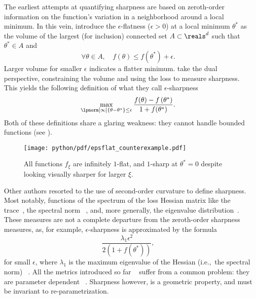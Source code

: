 The earliest attempts at quantifying sharpness are based on zeroth-order information
on the function's variation in a neighborhood around a local minimum.
In this vein, \citet{hochreiterFlatMinima1997} introduce
the \(\epsilon\)-flatness (\(\epsilon \gt 0\)) at a local minimum \(\theta^{\ast}\) as
the volume of the largest (for inclusion) connected set \(A \subset \reals^{d}\) such that
\(\theta^{\ast}\in A \) and
\begin{equation}\label{eq:sharpness:epsflatness}
	\forall \theta\in A, \quad f(\theta) \leq f(\theta^{\ast}) + \epsilon.
\end{equation}
Larger volume for smaller \(\epsilon\) indicates a flatter minimum.
\citet{keskarLargeBatchTrainingDeep2022} take the dual perspective,
constraining the volume and using the loss to measure sharpness.
This yields the following definition of what they call \(\epsilon\)-sharpness
\begin{equation}\label{eq:sharpness:epsharpness}
	\max_{\lpnorm[\infty]{\theta - \theta^{\ast}}\le\epsilon}%
	{\frac{f(\theta) - f\left( \theta^{\ast} \right)}{1+f(\theta^{\ast})}}.
\end{equation}
Both of these definitions share a glaring weakness: they cannot handle bounded functions
(see ).
\begin{figure}[hbt]
	\begin{center}
		\texttt{[image: python/pdf/epsflat\_counterexample.pdf]}
	\end{center}
	\caption{%
		All functions \(f_{\xi}\) are infinitely \(1\)-flat, and \(1\)-sharp at \(\theta^{\ast} = 0\)
		despite looking visually sharper for larger \(\xi\).
	}\label{fig:epsflat_counterexample}
\end{figure}

Other authors resorted to the use of second-order curvature to define sharpness.
Most notably, functions of the spectrum of the loss Hessian matrix
like the trace~\cite{%
	yangTaxonomizingLocalGlobal2021,%
	petzkaRelativeFlatnessGeneralization2021,%
	ibayashiMinimumSharpnessScaleinvariant2021,%
	leeNewCharacterizationEdge2022,%
	petzkaReparameterizationInvariantFlatnessMeasure2019%
}, the spectral norm%
~\cite{yangTaxonomizingLocalGlobal2021,kaurMaximumHessianEigenvalue2023},
and, more generally, the eigenvalue distribution~\cite{%
	keskarLargeBatchTrainingDeep2022,%
	chaudhariEntropySGDBiasingGradient2019%
}.
These measures are not a complete departure from the zeroth-order sharpness measures,
as, for example, \(\epsilon\)-sharpness is approximated by the formula
\[
	\frac{\lambda_{1}\epsilon^{2}}{2 \left( 1+f\left( \theta^{\ast} \right) \right)},
\]
for small \(\epsilon\), where \(\lambda_{1}\) is the maximum eigenvalue of the Hessian
(i.e.,\ the spectral norm)%
~\cite{keskarLargeBatchTrainingDeep2022,zhangWhyFlatnessDoes2021,dinhSharpMinimaCan2017}.
All the metrics introduced so far%
~\cite[including the zeroth-order ones][]{ibayashiMinimumSharpnessScaleinvariant2021}
suffer from a common problem: they are parameter dependent%
~\cite{%
	dinhSharpMinimaCan2017,%
	jangReparametrizationInvariantSharpnessMeasure2022,zhangWhyFlatnessDoes2021,%
	liangFisherRaoMetricGeometry2019%
}.
Sharpness however, is a geometric property, and must be invariant to re-parametrization.

